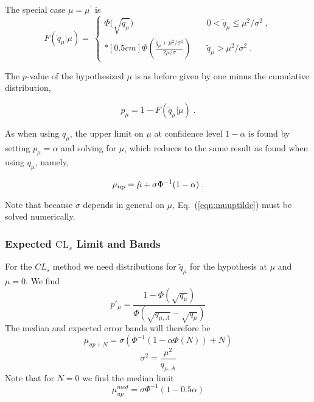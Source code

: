 The special case $\mu = \mu^{\prime}$ is
\begin{equation}
\label{eqn:tildeqmmcdf} 
F(\tilde{q}_{\mu}|\mu) = 
 \: \left\{ \! \! \begin{array}{lll}
\Phi\Big( \sqrt{\tilde{q}_{\mu}} \Big)
                 & \quad 0 < \tilde{q}_{\mu} \le \mu^2/\sigma^2  
\;, \\*[0.5 cm]
\Phi \left( \frac{ \tilde{q}_{\mu} + \mu^2/\sigma^2}
{2\mu/\sigma} \right)
                 &  \quad \tilde{q}_{\mu} > \mu^2/\sigma^2 \;.
              \end{array}
       \right.
\end{equation}


The $p$-value of the hypothesized $\mu$ is as before
given by one minus the cumulative distribution,


\begin{equation}
\label{eqn:pvalmutilde}
p_{\mu} = 1 - F(\tilde{q}_{\mu} | \mu) \;.
\end{equation}


As when using $q_{\mu}$, the upper limit on $\mu$ at confidence level
$1 - \alpha$ is found by setting $p_{\mu} = \alpha$ and solving for
$\mu$, which reduces to the same result as found when using $q_{\mu}$,
namely,


\begin{equation}
\label{eqn:muuptilde}
\mu_{\rm up} =  \hat{\mu} + \sigma \Phi^{-1}(1 - \alpha) \;.
\end{equation}


Note that because $\sigma$ depends in general on $\mu$,
Eq.~(\ref{eqn:muuptilde}) must be solved numerically.  


\subsubsection{Expected $\mathrm{CL}_s$ Limit and Bands}
For the $CL_s$ method we need distributions for $\tilde{q}_\mu$ for the hypothesis at $\mu$ and $\mu=0$.   We find
\begin{equation}
 p'_{\mu}=\frac{1-\Phi(\sqrt{q_\mu})}{\Phi(\sqrt{q_{\mu,A}}-\sqrt{q_{\mu}})}
 \end{equation}
The median and expected error bands will therefore be
\begin{equation}
   \mu_{{up}+N}=\sigma(\Phi^{-1}(1-\alpha \Phi(N))+N)
   \end{equation}
\begin{equation}
   \sigma^2=\frac{\mu^2}{q_{\mu,A}}
      \end{equation}
Note that for $N=0$ we find the median limit    
\begin{equation}
   \mu_{up}^{med}=\sigma \Phi^{-1}(1-0.5\alpha)
      \end{equation}


